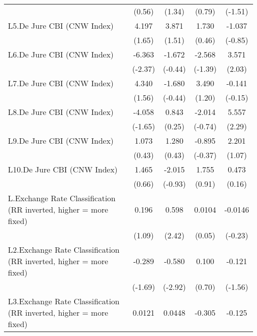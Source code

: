 {\begin{longtable}{l*{4}{c}}
                &   (0.56)         &   (1.34)         &   (0.79)         &  (-1.51)         \\
[1em]
L5.De Jure CBI (CNW Index)&    4.197         &    3.871         &    1.730         &   -1.037         \\
                &   (1.65)         &   (1.51)         &   (0.46)         &  (-0.85)         \\
[1em]
L6.De Jure CBI (CNW Index)&   -6.363\sym{*}  &   -1.672         &   -2.568         &    3.571\sym{*}  \\
                &  (-2.37)         &  (-0.44)         &  (-1.39)         &   (2.03)         \\
[1em]
L7.De Jure CBI (CNW Index)&    4.340         &   -1.680         &    3.490         &   -0.141         \\
                &   (1.56)         &  (-0.44)         &   (1.20)         &  (-0.15)         \\
[1em]
L8.De Jure CBI (CNW Index)&   -4.058         &    0.843         &   -2.014         &    5.557\sym{*}  \\
                &  (-1.65)         &   (0.25)         &  (-0.74)         &   (2.29)         \\
[1em]
L9.De Jure CBI (CNW Index)&    1.073         &    1.280         &   -0.895         &    2.201         \\
                &   (0.43)         &   (0.43)         &  (-0.37)         &   (1.07)         \\
[1em]
L10.De Jure CBI (CNW Index)&    1.465         &   -2.015         &    1.755         &    0.473         \\
                &   (0.66)         &  (-0.93)         &   (0.91)         &   (0.16)         \\
[1em]
L.Exchange Rate Classification (RR inverted, higher = more fixed)&    0.196         &    0.598\sym{*}  &   0.0104         &  -0.0146         \\
                &   (1.09)         &   (2.42)         &   (0.05)         &  (-0.23)         \\
[1em]
L2.Exchange Rate Classification (RR inverted, higher = more fixed)&   -0.289         &   -0.580\sym{**} &    0.100         &   -0.121         \\
                &  (-1.69)         &  (-2.92)         &   (0.70)         &  (-1.56)         \\
[1em]
L3.Exchange Rate Classification (RR inverted, higher = more fixed)&   0.0121         &   0.0448         &   -0.305\sym{*}  &   -0.125         \\

\end{longtable}}
